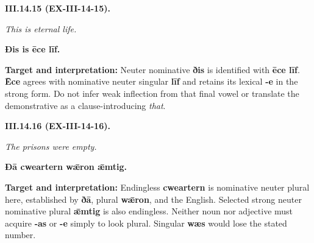 \par\begin{minipage}{\linewidth}\raggedright
\textbf{III.14.15 (EX-III-14-15).}

\emph{This is eternal life.}

\textbf{Ðis is ēce līf.}

\textbf{Target and interpretation:} Neuter nominative \textbf{ðis} is identified with \textbf{ēce līf}. \textbf{Ēce} agrees with nominative neuter singular \textbf{līf} and retains its lexical \textbf{-e} in the strong form. Do not infer weak inflection from that final vowel or translate the demonstrative as a clause-introducing \emph{that}.

\end{minipage}\par\addvspace{4pt}

\par\begin{minipage}{\linewidth}\raggedright
\textbf{III.14.16 (EX-III-14-16).}

\emph{The prisons were empty.}

\textbf{Ðā cweartern wǣron ǣmtig.}

\textbf{Target and interpretation:} Endingless \textbf{cweartern} is nominative neuter plural here, established by \textbf{ðā}, plural \textbf{wǣron}, and the English. Selected strong neuter nominative plural \textbf{ǣmtig} is also endingless. Neither noun nor adjective must acquire \textbf{-as} or \textbf{-e} simply to look plural. Singular \textbf{wæs} would lose the stated number.

\end{minipage}\par\addvspace{4pt}

